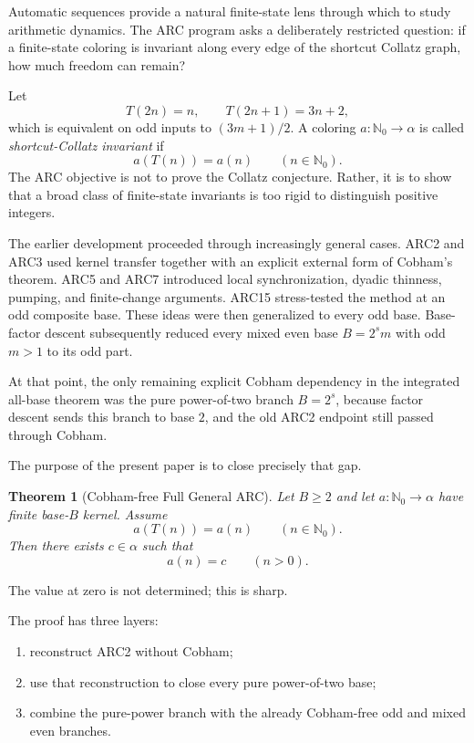 \documentclass[11pt]{article}
\newtheorem{theorem}{Theorem}[section]
\theoremstyle{remark}
\newcommand{\Nzero}{\mathbb{N}_0}
\begin{document}
Automatic sequences provide a natural finite-state lens through which to study
arithmetic dynamics.  The ARC program asks a deliberately restricted question:
if a finite-state coloring is invariant along every edge of the shortcut
Collatz graph, how much freedom can remain?

Let
\[
T(2n)=n,\qquad T(2n+1)=3n+2,
\]
which is equivalent on odd inputs to $(3m+1)/2$.  A coloring
$a:\Nzero\to\alpha$ is called \emph{shortcut-Collatz invariant} if
\[
a(T(n))=a(n)\qquad(n\in\Nzero).
\]
The ARC objective is not to prove the Collatz conjecture.  Rather, it is to
show that a broad class of finite-state invariants is too rigid to distinguish
positive integers.

The earlier development proceeded through increasingly general cases.
ARC2 and ARC3 used kernel transfer together with an explicit external form of
Cobham's theorem.  ARC5 and ARC7 introduced local synchronization, dyadic
thinness, pumping, and finite-change arguments.  ARC15 stress-tested the method
at an odd composite base.  These ideas were then generalized to every odd
base.  Base-factor descent subsequently reduced every mixed even base
$B=2^s m$ with odd $m>1$ to its odd part.

At that point, the only remaining explicit Cobham dependency in the integrated
all-base theorem was the pure power-of-two branch $B=2^s$, because factor
descent sends this branch to base $2$, and the old ARC2 endpoint still passed
through Cobham.

The purpose of the present paper is to close precisely that gap.

\begin{theorem}[Cobham-free Full General ARC]\label{thm:main}
Let $B\ge2$ and let $a:\Nzero\to\alpha$ have finite base-$B$ kernel.
Assume
\[
a(T(n))=a(n)\qquad(n\in\Nzero).
\]
Then there exists $c\in\alpha$ such that
\[
a(n)=c\qquad(n>0).
\]
\end{theorem}

The value at zero is not determined; this is sharp.

The proof has three layers:
\begin{enumerate}[label=(\roman*)]
\item reconstruct ARC2 without Cobham;
\item use that reconstruction to close every pure power-of-two base;
\item combine the pure-power branch with the already Cobham-free odd and mixed
      even branches.
\end{enumerate}
\end{document}
